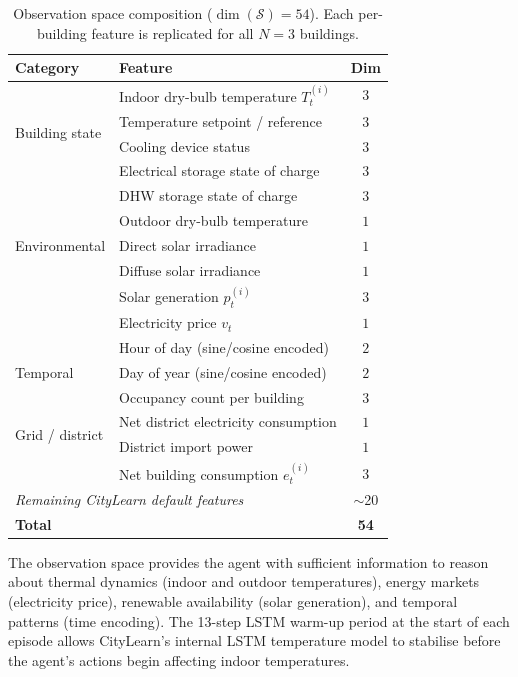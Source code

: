 \begin{table}[htbp]
\centering
\caption{Observation space composition ($\dim(\mathcal{S}) = 54$).  Each
  per-building feature is replicated for all $N=3$ buildings.}
\label{tab:observation-space}
\begin{tabular}{llc}
\toprule
\textbf{Category} & \textbf{Feature} & \textbf{Dim} \\
\midrule
\multirow{4}{*}{Building state}
  & Indoor dry-bulb temperature $T_t^{(i)}$ & $3$ \\
  & Temperature setpoint / reference & $3$ \\
  & Cooling device status & $3$ \\
  & Electrical storage state of charge & $3$ \\
  & DHW storage state of charge & $3$ \\
\midrule
\multirow{3}{*}{Environmental}
  & Outdoor dry-bulb temperature & $1$ \\
  & Direct solar irradiance & $1$ \\
  & Diffuse solar irradiance & $1$ \\
  & Solar generation $p_t^{(i)}$ & $3$ \\
  & Electricity price $v_t$ & $1$ \\
\midrule
\multirow{3}{*}{Temporal}
  & Hour of day (sine/cosine encoded) & $2$ \\
  & Day of year (sine/cosine encoded) & $2$ \\
  & Occupancy count per building & $3$ \\
\midrule
\multirow{2}{*}{Grid / district}
  & Net district electricity consumption & $1$ \\
  & District import power & $1$ \\
  & Net building consumption $e_t^{(i)}$ & $3$ \\
\midrule
\multicolumn{2}{l}{\textit{Remaining CityLearn default features}} & $\sim$20 \\
\bottomrule
\multicolumn{2}{l}{\textbf{Total}} & \textbf{54} \\
\end{tabular}
\end{table}

The observation space provides the agent with sufficient information to reason
about thermal dynamics (indoor and outdoor temperatures), energy markets
(electricity price), renewable availability (solar generation), and temporal
patterns (time encoding).  The 13-step LSTM warm-up period at the start of
each episode allows CityLearn's internal LSTM temperature model to stabilise
before the agent's actions begin affecting indoor temperatures.

